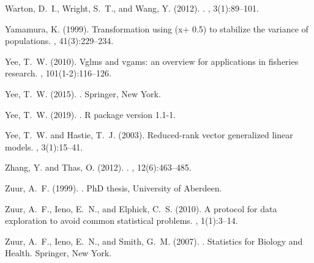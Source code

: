 \documentclass[a4paper,11pt]{article}
\begin{document}
\begin{thebibliography}{}
Warton, D.~I., Wright, S.~T., and Wang, Y. (2012).
.
, 3(1):89--101.

Yamamura, K. (1999).
\newblock Transformation using (x+ 0.5) to stabilize the variance of
  populations.
, 41(3):229--234.

Yee, T.~W. (2010).
\newblock Vglms and vgams: an overview for applications in fisheries research.
, 101(1-2):116--126.

Yee, T.~W. (2015).
.
\newblock Springer, New York.

Yee, T.~W. (2019).
.
\newblock R package version 1.1-1.

Yee, T.~W. and Hastie, T.~J. (2003).
\newblock Reduced-rank vector generalized linear models.
, 3(1):15--41.

Zhang, Y. and Thas, O. (2012).
.
, 12(6):463--485.

Zuur, A.~F. (1999).
.
\newblock PhD thesis, University of Aberdeen.

Zuur, A.~F., Ieno, E.~N., and Elphick, C.~S. (2010).
\newblock A protocol for data exploration to avoid common statistical problems.
, 1(1):3--14.

Zuur, A.~F., Ieno, E.~N., and Smith, G.~M. (2007).
.
\newblock Statistics for Biology and Health. Springer, New York.

\end{thebibliography}

\newpage
\setcounter{figure}{0}
\setcounter{table}{0}
\end{document}
